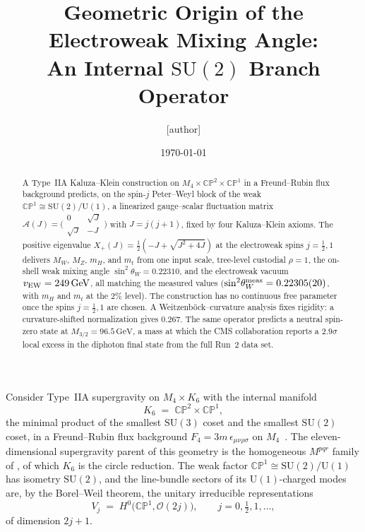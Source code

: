 \documentclass[aps,prl,twocolumn,superscriptaddress,floatfix,nofootinbib,reprint]{revtex4-2}
\newcommand{\Xp}{X_{+}}
\newcommand{\half}{\tfrac12}
\newcommand{\sinsq}{\sin^{2}\!\theta_{W}}
\newcommand{\cA}{\mathcal{A}}
\newcommand{\cO}{\mathcal{O}}
\newcommand{\SU}{\mathrm{SU}}
\newcommand{\U}{\mathrm{U}}
\newcommand{\CP}{\mathbb{CP}}
\begin{document}
\title{Geometric Origin of the Electroweak Mixing Angle:\\
An Internal $\SU(2)$ Branch Operator}

\author{[author]}
\affiliation{[affiliation]}

\date{\today}

\begin{abstract}
A Type~IIA Kaluza--Klein construction on
$M_{4}\times\CP^{2}\times\CP^{1}$ in a Freund--Rubin flux background
predicts, on the spin-$j$ Peter--Weyl block of the weak
$\CP^{1}\cong\SU(2)/\U(1)$, a linearized gauge--scalar fluctuation
matrix $\cA(J)=\bigl(\begin{smallmatrix}0&\sqrt J\\\sqrt J&-J\end{smallmatrix}\bigr)$
with $J=j(j+1)$, fixed by four Kaluza--Klein axioms.  The positive
eigenvalue $\Xp(J)=\tfrac12(-J+\sqrt{J^{2}+4J})$ at the electroweak
spins $j=\half,1$ delivers $M_{W}$, $M_{Z}$, $m_{H}$, and $m_{t}$ from
one input scale, tree-level custodial $\rho=1$, the on-shell weak
mixing angle $\sinsq=0.22310$, and the electroweak vacuum
$v_{\rm EW}=249\,\text{GeV}$, all matching the measured values
($\sinsq^{\rm meas}=0.22305(20)$, with $m_{H}$ and $m_{t}$ at the
$2\%$ level).  The construction has no continuous free parameter once
the spins $j=\half,1$ are chosen.  A Weitzenb\"ock--curvature analysis
fixes rigidity: a curvature-shifted normalization gives $0.267$.  The
same operator predicts a neutral spin-zero state at
$M_{3/2}=96.5\,\text{GeV}$, a mass at which the CMS collaboration
reports a $2.9\sigma$ local excess in the diphoton final state from
the full Run~2 data set.
\end{abstract}

\maketitle


Consider Type~IIA supergravity on $M_{4}\times K_{6}$ with the
internal manifold
\begin{equation}
  K_{6}\;=\;\CP^{2}\times\CP^{1},
\label{eq:K6}
\end{equation}
the minimal product of the smallest $\SU(3)$ coset and the smallest
$\SU(2)$ coset, in a Freund--Rubin flux background
$F_{4}=3m\,\epsilon_{\mu\nu\rho\sigma}$ on $M_{4}$~\cite{FreundRubin1980}.
The eleven-dimensional supergravity parent of this geometry is the
homogeneous $M^{pqr}$ family of \cite{BailinLove1984,DuffNilssonPope1986},
of which $K_{6}$ is the circle reduction.  The weak factor
$\CP^{1}\cong\SU(2)/\U(1)$ has isometry $\SU(2)$, and the line-bundle
sectors of its $\U(1)$-charged modes are, by the Borel--Weil theorem,
the unitary irreducible representations
\begin{equation}
  V_{j}\;=\;H^{0}\bigl(\CP^{1},\cO(2j)\bigr),\qquad j=0,\half,1,\dots,
\label{eq:bw}
\end{equation}
of dimension $2j+1$.
\end{document}
